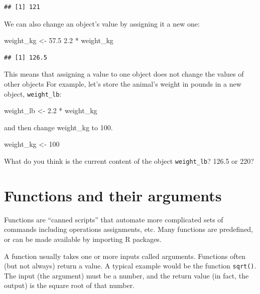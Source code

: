\documentclass[
]{book}
\newenvironment{Shaded}{\begin{snugshade}}{\end{snugshade}}
\newcommand{\DecValTok}[1]{\textcolor[rgb]{0.00,0.00,0.81}{#1}}
\newcommand{\FloatTok}[1]{\textcolor[rgb]{0.00,0.00,0.81}{#1}}
\newcommand{\NormalTok}[1]{#1}
\newcommand{\OtherTok}[1]{\textcolor[rgb]{0.56,0.35,0.01}{#1}}
\newcommand{\SpecialCharTok}[1]{\textcolor[rgb]{0.00,0.00,0.00}{#1}}
\begin{document}
\begin{verbatim}
## [1] 121
\end{verbatim}

We can also change an object's value by assigning it a new one:

\begin{Shaded}
\begin{Highlighting}[]
\NormalTok{weight\_kg }\OtherTok{\textless{}{-}} \FloatTok{57.5}
\FloatTok{2.2} \SpecialCharTok{*}\NormalTok{ weight\_kg}
\end{Highlighting}
\end{Shaded}

\begin{verbatim}
## [1] 126.5
\end{verbatim}

This means that assigning a value to one object does not change the values of other objects For example, let's store the animal's weight in pounds in a new object, \texttt{weight\_lb}:

\begin{Shaded}
\begin{Highlighting}[]
\NormalTok{weight\_lb }\OtherTok{\textless{}{-}} \FloatTok{2.2} \SpecialCharTok{*}\NormalTok{ weight\_kg}
\end{Highlighting}
\end{Shaded}

and then change weight\_kg to 100.

\begin{Shaded}
\begin{Highlighting}[]
\NormalTok{weight\_kg }\OtherTok{\textless{}{-}} \DecValTok{100}
\end{Highlighting}
\end{Shaded}

What do you think is the current content of the object \texttt{weight\_lb}? 126.5 or 220?

\hypertarget{functions-and-their-arguments}{%
\section{Functions and their arguments}\label{functions-and-their-arguments}}

Functions are ``canned scripts'' that automate more complicated sets of commands including operations assignments, etc. Many functions are predefined, or can be made available by importing R packages.

A function usually takes one or more inputs called arguments. Functions often (but not always) return a value. A typical example would be the function \texttt{sqrt()}. The input (the argument) must be a number, and the return value (in fact, the output) is the square root of that number.
\end{document}
